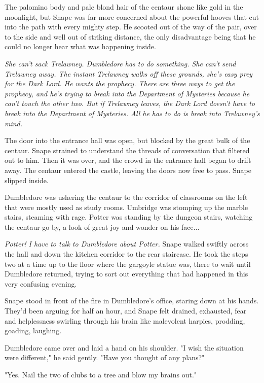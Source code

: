 The palomino body and pale blond hair of the centaur shone like gold in the moonlight, but Snape was far more concerned about the powerful hooves that cut into the path with every mighty step. He scooted out of the way of the pair, over to the side and well out of striking distance, the only disadvantage being that he could no longer hear what was happening inside.

\emph{She can't sack Trelawney. Dumbledore has to do something. She can't send Trelawney away. The instant Trelawney walks off these grounds, she's easy prey for the Dark Lord. He wants the prophecy. There are three ways to get the prophecy, and he's trying to break into the Department of Mysteries because he can't touch the other two. But if Trelawney leaves, the Dark Lord doesn't have to break into the Department of Mysteries. All he has to do is break into Trelawney's mind.}

The door into the entrance hall was open, but blocked by the great bulk of the centaur. Snape strained to understand the threads of conversation that filtered out to him. Then it was over, and the crowd in the entrance hall began to drift away. The centaur entered the castle, leaving the doors now free to pass. Snape slipped inside.

Dumbledore was ushering the centaur to the corridor of classrooms on the left that were mostly used as study rooms. Umbridge was stomping up the marble stairs, steaming with rage. Potter was standing by the dungeon stairs, watching the centaur go by, a look of great joy and wonder on his face...

\emph{Potter! I have to talk to Dumbledore about Potter.} Snape walked swiftly across the hall and down the kitchen corridor to the rear staircase. He took the steps two at a time up to the floor where the gargoyle statue was, there to wait until Dumbledore returned, trying to sort out everything that had happened in this very confusing evening.

\sbreak

Snape stood in front of the fire in Dumbledore's office, staring down at his hands. They'd been arguing for half an hour, and Snape felt drained, exhausted, fear and helplessness swirling through his brain like malevolent harpies, prodding, goading, laughing.

Dumbledore came over and laid a hand on his shoulder. "I wish the situation were different," he said gently. "Have you thought of any plans?"

"Yes. Nail the two of clubs to a tree and blow my brains out."

